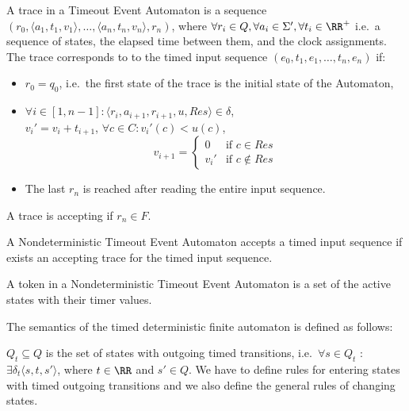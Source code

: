 			\begin{dfn}
			\label{dfn:cep:tea:trace}
			A trace in a Timeout Event Automaton is a sequence
			$(r_0, \langle a_1, t_1, v_1\rangle, \dots, \langle a_n, t_n, v_n \rangle, r_n)$, where $\forall r_i \in Q, \forall a_i \in \Sigma', \forall t_i \in \RR^+$ i.e.~a sequence of states, the elapsed time between them, and the clock assignments. The trace corresponds to to the timed input sequence $(e_0, t_1, e_1, \dots, t_n, e_n)$ if:
			\begin{itemize}
				\item $r_0 = q_0$, i.e.~the first state of the trace is the initial state of the Automaton,
				\item $\forall i \in [1,n - 1] \colon \langle r_i, a_{i+1}, r_{i+1}, u, \mathit{Res} \rangle \in \delta$, \\
					${v_i}' = v_i + t_{i+1}$, $\forall c \in C \colon {v_i}'(c) < u(c)$,\\
					$$v_{i+1} = \begin{cases}
									0      & \text{if\ } c \in    \mathit{Res} \\
									{v_i}' & \text{if\ } c \notin \mathit{Res}
								\end{cases}$$
				\item The last $r_n$ is reached after reading the entire input sequence.	
			\end{itemize}
			A trace is accepting if $r_n \in F$.
			\end{dfn}
			
			\begin{dfn}
				\label{dfn:cep:tea:accepting}
				A Nondeterministic Timeout Event Automaton accepts a timed input sequence if exists an accepting trace for the timed input sequence.
			\end{dfn}
			
			\begin{dfn}
				\label{dfn:cep:tea:token}
				A token in a Nondeterministic Timeout Event Automaton is a set of the active states with their timer values.
			\end{dfn}
			
			The semantics of the timed deterministic finite automaton is defined as follows:
			
			
			$Q_t \subseteq Q$ is the set of states with outgoing timed transitions, 
			i.e.~$\forall s \in Q_t$ : $ \exists \delta_t\langle s, t, s' \rangle$, where $t \in \RR$ and $s' \in Q$.
			We have to define rules for entering states with timed outgoing transitions and we also define the general rules of changing states. 
			
